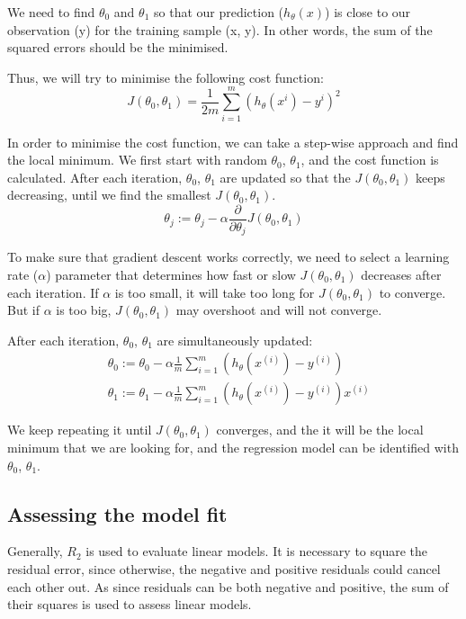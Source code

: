 \documentclass[11pt]{article}
\begin{document}
  We need to find $\theta_{0}$ and $\theta_{1}$ so that our prediction ($h_{\theta}(x)$) is close to our observation (y) for the training sample (x, y). In other words, the sum of the squared errors should be the minimised.
  
  Thus, we will try to minimise the following cost function:
  \[J( \theta_{0},\theta_{1}) = \frac{1}{2m}\sum_{i=1}^{m}(h_{\theta}(x^{i}) - y^{i})^2\]
  
  In order to minimise the cost function, we can take a step-wise approach and find the local minimum. We first start with random $\theta_{0}$, $\theta_{1}$, and the cost function is calculated. After each iteration, $\theta_{0}$, $\theta_{1}$ are updated so that the $J( \theta_{0},\theta_{1})$ keeps decreasing, until we find the smallest $J( \theta_{0},\theta_{1})$.
   \[\theta_{j} :=\theta_{j}-\alpha\frac{\partial }{\partial \theta_{j}}J(\theta_{0},\theta_{1})\]
   
   To make sure that gradient descent works correctly, we need to select a learning rate ($\alpha$) parameter that determines how fast or slow $J( \theta_{0},\theta_{1})$ decreases after each iteration. If $\alpha$ is too small, it will take too long for $J( \theta_{0},\theta_{1})$ to converge. But if $\alpha$ is too big, $J( \theta_{0},\theta_{1})$ may overshoot and will not converge.
   
   After each iteration, $\theta_{0}$, $\theta_{1}$ are simultaneously updated:
   \begin{align} 
   &\theta_{0}:=\theta_{0}-\alpha\frac{1}{m}\sum_{i=1}^{m}(h_{\theta}(x^{(i)})-y^{(i)})\nonumber\\
   &\theta_{1}:=\theta_{1}-\alpha\frac{1}{m}\sum_{i=1}^{m}(h_{\theta}(x^{(i)})-y^{(i)})x^{(i)}\nonumber
  \end{align}
  
 We keep repeating it until $J( \theta_{0},\theta_{1})$ converges, and the it will be the local minimum that we are looking for, and the regression model can be identified with $\theta_{0}$, $\theta_{1}$.
 
 \subsection{Assessing the model fit}
Generally, $R_{2}$ is used to evaluate linear models. It is necessary to square the residual error, since otherwise, the negative and positive residuals could cancel each other out. As since residuals can be both negative and positive, the sum of their squares is used to assess linear models.
\end{document}
